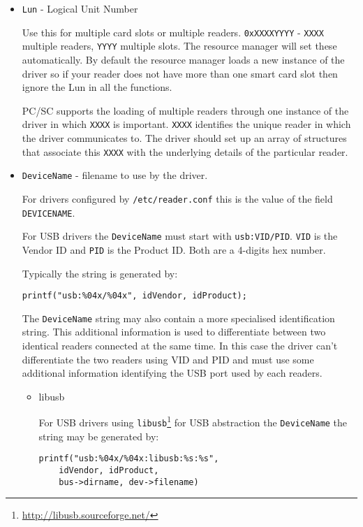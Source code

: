 \documentclass[a4paper,12pt]{article}
\begin{document}
\begin{itemize}
\item \texttt{Lun} - Logical Unit Number

Use this for multiple card slots or multiple readers.
\texttt{0xXXXXYYYY} - \texttt{XXXX} multiple readers, \texttt{YYYY}
multiple slots. The resource manager will set these automatically. By
default the resource manager loads a new instance of the driver so if
your reader does not have more than one smart card slot then ignore the
Lun in all the functions.

PC/SC supports the loading of multiple readers through one instance of
the driver in which \texttt{XXXX} is important. \texttt{XXXX} identifies
the unique reader in which the driver communicates to. The driver should
set up an array of structures that associate this \texttt{XXXX} with the
underlying details of the particular reader.

\item \texttt{DeviceName} - filename to use by the driver.

For drivers configured by \texttt{/etc/reader.conf} this is the value of
the field \texttt{DEVICENAME}.

For USB drivers the \texttt{DeviceName} must start with
\texttt{usb:VID/PID}. \texttt{VID} is the Vendor ID and \texttt{PID} is
the Product ID. Both are a 4-digits hex number.

Typically the string is generated by:
\begin{verbatim}
printf("usb:%04x/%04x", idVendor, idProduct);
\end{verbatim}

The \texttt{DeviceName} string may also contain a more specialised
identification string. This additional information is used to
differentiate between two identical readers connected at the same time.
In this case the driver can't differentiate the two readers using VID
and PID and must use some additional information identifying the USB
port used by each readers.

\begin{itemize}
\item libusb

For USB drivers using
\texttt{libusb}\footnote{\url{http://libusb.sourceforge.net/}} for USB
abstraction the \texttt{DeviceName} the string may be generated by:
\begin{verbatim}
printf("usb:%04x/%04x:libusb:%s:%s",
    idVendor, idProduct,
    bus->dirname, dev->filename)
\end{verbatim}


\end{itemize}
\end{itemize}
\end{document}

